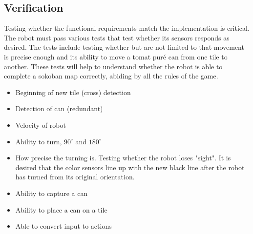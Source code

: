 \documentclass[../../main.tex]{subfiles}
\begin{document}
\subsection{Verification}%
\label{sub:verification}

Testing whether the functional requirements match the implementation is critical.
The robot must pass various tests that test whether its sensors responds as desired. The tests include testing whether but are not limited to that movement is precise enough and its ability to move a tomat puré can from one tile to another. These tests will help to understand whether the robot is able to complete a sokoban map correctly, abiding by all the rules of the game.

\begin{itemize}
	\item Beginning of new tile (cross) detection
	
	\item Detection of can (redundant)
	
	\item Velocity of robot
	
	\item Ability to turn, $90^{\circ}$ and $180^{\circ}$
	
	\item How precise the turning is. Testing whether the robot loses "sight". It is desired that the color sensors line up with the new black line after the robot has turned from its original orientation.
	
	\item Ability to capture a can
	
	\item Ability to place a can on a tile
	
	\item Able to convert input to actions
	
	
\end{itemize}


	
\end{document}
